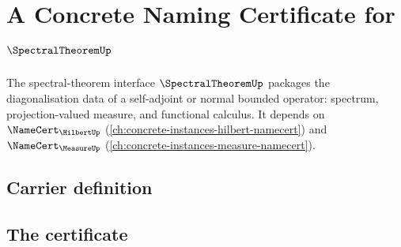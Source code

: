 \chapter{A Concrete Naming Certificate for $\SpectralTheoremUp$}
\label{ch:concrete-instances-spectraltheorem-namecert}

The spectral-theorem interface $\SpectralTheoremUp$ packages the diagonalisation data of a self-adjoint or normal bounded operator: spectrum, projection-valued measure, and functional calculus. It depends on $\NameCert_{\HilbertUp}$ (\autoref{ch:concrete-instances-hilbert-namecert}) and $\NameCert_{\MeasureUp}$ (\autoref{ch:concrete-instances-measure-namecert}).

\section{Carrier definition}
\label{sec:spectraltheorem-carrier}

\section{The certificate}
\label{sec:spectraltheorem-certificate}

